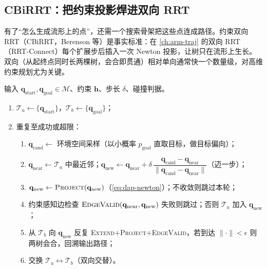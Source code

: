 \subsection{CBiRRT：把约束投影焊进双向 RRT}
\label{subsec:dap-cbirrt}

有了“怎么生成流形上的点”，还需一个搜索骨架把这些点连成路径。约束双向 RRT（CBiRRT，Berenson 等\cite{berenson2011tsr}）是事实标准：在 \cref{ch:arm-traj} 的双向 RRT（RRT-Connect\cite{kuffner2000rrtconnect}）每个扩展步后插入一次 Newton 投影，让树只在流形上生长。双向（从起终点同时长两棵树，会合即贯通）相对单向通常快一个数量级，对高维约束规划尤为关键。

\begin{algo}\label{alg:dap-cbirrt}
输入 $\mathbf{q}_{\text{start}},\mathbf{q}_{\text{goal}}\in\mathcal{M}$、约束 $\mathbf{h}$、步长 $\delta$、碰撞判据。
\begin{enumerate}
  \item $\mathcal{T}_a\leftarrow\{\mathbf{q}_{\text{start}}\}$，$\mathcal{T}_b\leftarrow\{\mathbf{q}_{\text{goal}}\}$；
  \item 重复至成功或超限：
  \begin{enumerate}
    \item $\mathbf{q}_{\text{rand}}\leftarrow$ 环境空间采样（以小概率 $p_{\text{goal}}$ 直取目标，做目标偏向）；
    \item $\mathbf{q}_{\text{near}}\leftarrow\mathcal{T}_a$ 中最近邻；$\mathbf{q}_{\text{new}}\leftarrow\mathbf{q}_{\text{near}}+\delta\,\dfrac{\mathbf{q}_{\text{rand}}-\mathbf{q}_{\text{near}}}{\|\mathbf{q}_{\text{rand}}-\mathbf{q}_{\text{near}}\|}$（迈一步）；
    \item $\mathbf{q}_{\text{new}}\leftarrow\textsc{Project}(\mathbf{q}_{\text{new}})$（\cref{eq:dap-newton}）；不收敛则跳过本轮；
    \item 约束感知边检查 $\textsc{EdgeValid}(\mathbf{q}_{\text{near}},\mathbf{q}_{\text{new}})$ 失败则跳过；否则 $\mathcal{T}_a$ 加入 $\mathbf{q}_{\text{new}}$；
    \item 从 $\mathcal{T}_b$ 向 $\mathbf{q}_{\text{new}}$ 反复 \textsc{Extend}$+$\textsc{Project}$+$\textsc{EdgeValid}，若到达 $\|\cdot\|<\epsilon$ 则两树会合，回溯输出路径；
    \item 交换 $\mathcal{T}_a\leftrightarrow\mathcal{T}_b$（双向交替）。
  \end{enumerate}
\end{enumerate}
\end{algo}

